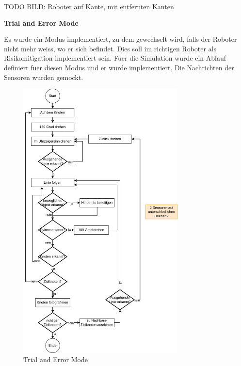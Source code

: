 TODO BILD: Roboter auf Kante, mit entfernten Kanten 

\textbf{Trial and Error Mode}

Es wurde ein Modus implementiert, zu dem gewechselt wird, falls der Roboter nicht mehr weiss, wo er sich befindet. Dies soll im richtigen Roboter als Risikomitigation implementiert sein. Fuer die Simulation wurde ein Ablauf definiert fuer diesen Modus und er wurde implementiert. Die Nachrichten der Sensoren wurden gemockt.

\begin{figure}[H]
\centering
\includegraphics[width=0.75\textwidth]{assets/informatik-prototyp/simulator/simulator-trial-and-error-mode.png}
\caption{Trial and Error Mode}
\label{fig:sim-trial-error}
\end{figure}